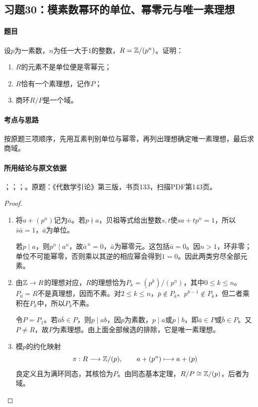 \subsection{习题30：模素数幂环的单位、幂零元与唯一素理想}

\label{ex:3:30}

\paragraph{题目}

设$p$为一素数，$n$为任一大于$1$的整数，$R=\mathbb Z/(p^n)$。证明：
\begin{enumerate}[label=(\roman*)]
\item $R$的元素不是单位便是零幂元；
\item $R$恰有一个素理想，记作$P$；
\item 商环$R/P$是一个域。
\end{enumerate}

\paragraph{考点与思路}

按原题三项顺序，先用互素判别单位与幂零，再列出理想确定唯一素理想，最后求商域。

\paragraph{所用结论与原文依据}

；；；。原题：《代数学引论》第三版，书页133，扫描PDF第143页。


\begin{proof}

\begin{enumerate}[label=(\roman*)]
\item 将$a+(p^n)$记为$\bar a$。若$p\nmid a$，贝祖等式给出整数$s,t$使$sa+tp^n=1$，所以$\bar s\bar a=1$，$\bar a$为单位。

若$p\mid a$，则$p^n\mid a^n$，故$\bar a^{\,n}=0$，$\bar a$为幂零元。这包括$\bar a=0$。因$n>1$，环非零；单位不可能幂零，否则乘以其逆的相应幂会得到$1=0$。因此两类穷尽全部元素。
\item 由$\mathbb Z\to R$的理想对应，$R$的理想恰为$P_k=(p^k)/(p^n)$，其中$0\le k\le n$。$P_0=R$不是真理想，因而不素。对$2\le k\le n$，$\bar p\notin P_k$、$\overline{p^{k-1}}\notin P_k$，但二者乘积在$P_k$中，所以$P_k$不素。

令$P=P_1$。若$\bar a\bar b\in P$，则$p\mid ab$，因$p$为素数，$p\mid a$或$p\mid b$，即$\bar a\in P$或$\bar b\in P$。又$P\ne R$，故$P$为素理想。由上面全部候选的排除，它是唯一素理想。
\item 模$p$的约化映射
\[
\pi:R\longrightarrow\mathbb Z/(p),\qquad a+(p^n)\longmapsto a+(p)
\]
良定义且为满环同态，其核恰为$P$。由同态基本定理，$R/P\cong\mathbb Z/(p)$，后者为域。
\end{enumerate}

\end{proof}


